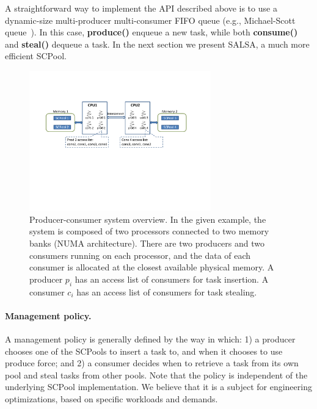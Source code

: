 A straightforward way to implement the API described above is to use a dynamic-size multi-producer multi-consumer FIFO queue (e.g., Michael-Scott queue~\cite{Michael:1996:SFP:248052.248106}).
In this case, {\bf produce()} enqueue a new task, while both {\bf consume()} and {\bf steal()} dequeue a task. In the next section we present SALSA, a much more efficient SCPool.

\begin{figure}[htb]
	\centering
	\includegraphics[width=0.7\textwidth]{figures/system-fig}
	\caption{\footnotesize{Producer-consumer system overview. In the given example, the system is composed of two processors connected to two memory banks (NUMA architecture). There are two producers and two consumers running on each processor, and the data of each consumer is allocated at the closest available physical memory. A producer $p_i$ has an access list of consumers for task insertion. A consumer $c_i$ has an access list of consumers for task stealing. }}
	\label{fig:system-fig}
\end{figure}

\paragraph {Management policy.}
A management policy is generally defined by the way in which: 1) a producer chooses one of the SCPools to insert a task to, and when it chooses to use produce force; and 2) a consumer decides when to retrieve a task from its own pool and steal tasks from other pools. 
Note that the policy is independent of the underlying SCPool implementation. We believe that it is a subject for engineering optimizations, based on specific workloads and demands.


